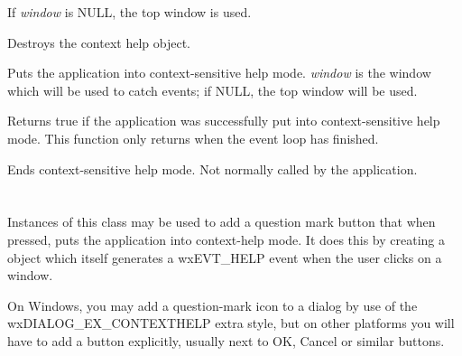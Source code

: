 If {\it window} is NULL, the top window is used.

\label{wxcontexthelpdtor}


Destroys the context help object.

\label{wxcontexthelpbegincontexthelp}


Puts the application into context-sensitive help mode. {\it window} is the window
which will be used to catch events; if NULL, the top window will be used.

Returns true if the application was successfully put into context-sensitive help mode.
This function only returns when the event loop has finished.

\label{wxcontexthelpendcontexthelp}


Ends context-sensitive help mode. Not normally called by the application.

\section{}\label{wxcontexthelpbutton}

Instances of this class may be used to add a question mark button that when pressed, puts the
application into context-help mode. It does this by creating a  object which itself
generates a wxEVT\_HELP event when the user clicks on a window.

On Windows, you may add a question-mark icon to a dialog by use of the wxDIALOG\_EX\_CONTEXTHELP extra style, but
on other platforms you will have to add a button explicitly, usually next to OK, Cancel or similar buttons.


\\
\\
\\
\\
\\


